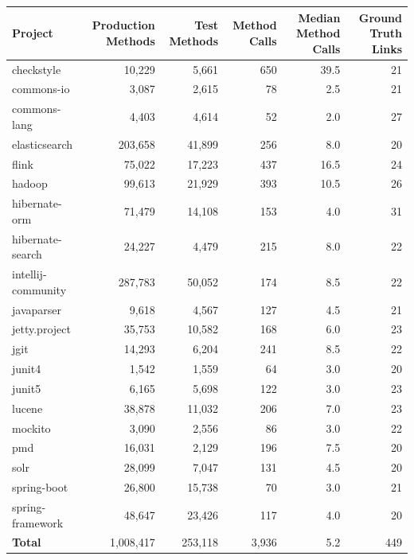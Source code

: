\begin{tabular}{lrrrrr}
\toprule
\textbf{Project} & \textbf{Production Methods} & \textbf{Test Methods} &
\textbf{Method Calls} & \textbf{Median Method Calls} &
\textbf{Ground Truth Links} \\
\midrule
checkstyle & 10,229 & 5,661 & 650 & 39.5 & 21 \\
commons-io & 3,087 & 2,615 & 78 & 2.5 & 21 \\
commons-lang & 4,403 & 4,614 & 52 & 2.0 & 27 \\
elasticsearch & 203,658 & 41,899 & 256 & 8.0 & 20 \\
flink & 75,022 & 17,223 & 437 & 16.5 & 24 \\
hadoop & 99,613 & 21,929 & 393 & 10.5 & 26 \\
hibernate-orm & 71,479 & 14,108 & 153 & 4.0 & 31 \\
hibernate-search & 24,227 & 4,479 & 215 & 8.0 & 22 \\
intellij-community & 287,783 & 50,052 & 174 & 8.5 & 22 \\
javaparser & 9,618 & 4,567 & 127 & 4.5 & 21 \\
jetty.project & 35,753 & 10,582 & 168 & 6.0 & 23 \\
jgit & 14,293 & 6,204 & 241 & 8.5 & 22 \\
junit4 & 1,542 & 1,559 & 64 & 3.0 & 20 \\
junit5 & 6,165 & 5,698 & 122 & 3.0 & 23 \\
lucene & 38,878 & 11,032 & 206 & 7.0 & 23 \\
mockito & 3,090 & 2,556 & 86 & 3.0 & 22 \\
pmd & 16,031 & 2,129 & 196 & 7.5 & 20 \\
solr & 28,099 & 7,047 & 131 & 4.5 & 20 \\
spring-boot & 26,800 & 15,738 & 70 & 3.0 & 21 \\
spring-framework & 48,647 & 23,426 & 117 & 4.0 & 20 \\
\midrule
\textbf{Total} & 1,008,417 & 253,118 & 3,936 & 5.2 & 449 \\
\bottomrule
\end{tabular}

